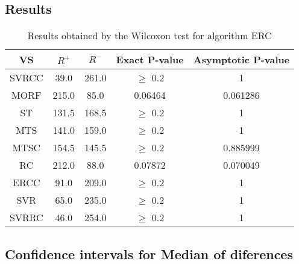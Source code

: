 \documentclass[a4paper,10pt]{article}
\begin{document}
\subsection{Results}

\begin{table}[!htp]
\centering\small
\begin{tabular}{
|c|c|c|c|c|}
\hline
 VS & $R^{+}$ & $R^{-}$ & Exact P-value & Asymptotic P-value \\ \hline 
SVRCC & 39.0 & 261.0 & $\geq$ 0.2 & 1\\ \hline 
MORF & 215.0 & 85.0 & 0.06464 & 0.061286\\ \hline 
ST & 131.5 & 168.5 & $\geq$ 0.2 & 1\\ \hline 
MTS & 141.0 & 159.0 & $\geq$ 0.2 & 1\\ \hline 
MTSC & 154.5 & 145.5 & $\geq$ 0.2 & 0.885999\\ \hline 
RC & 212.0 & 88.0 & 0.07872 & 0.070049\\ \hline 
ERCC & 91.0 & 209.0 & $\geq$ 0.2 & 1\\ \hline 
SVR & 65.0 & 235.0 & $\geq$ 0.2 & 1\\ \hline 
SVRRC & 46.0 & 254.0 & $\geq$ 0.2 & 1\\ \hline 

\end{tabular}
\caption{Results obtained by the Wilcoxon test for algorithm ERC}
\end{table}

\subsection{Confidence intervals for Median of diferences}
\end{document}
